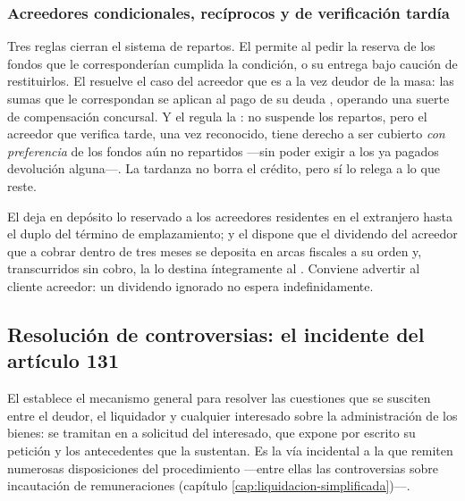 \subsubsection{Acreedores condicionales, recíprocos y de verificación tardía}

Tres reglas cierran el sistema de repartos. El  permite al 
pedir la reserva de los fondos que le corresponderían cumplida la condición, o su entrega bajo
caución de restituirlos. El  resuelve el caso del acreedor que es a la vez deudor de la
masa: las sumas que le correspondan se aplican al pago de su deuda , operando una suerte de compensación concursal. Y el  regula la
: no suspende los repartos, pero el acreedor que verifica
tarde, una vez reconocido, tiene derecho a ser cubierto \emph{con preferencia} de los fondos aún no
repartidos ---sin poder exigir a los ya pagados devolución alguna---. La tardanza no borra el
crédito, pero sí lo relega a lo que reste.

\begin{practica}
El  deja en depósito lo reservado a los acreedores residentes en el extranjero hasta el
duplo del término de emplazamiento; y el  dispone que el dividendo del acreedor que
 a cobrar dentro de tres meses se deposita en arcas fiscales a su orden y,
transcurridos  sin cobro, la \tgr{} lo destina íntegramente al
. Conviene advertir al cliente acreedor: un dividendo ignorado no
espera indefinidamente.
\end{practica}

\subsection{Resolución de controversias: el incidente del artículo 131}

El  establece el mecanismo general para resolver las cuestiones que se susciten entre el
deudor, el liquidador y cualquier interesado sobre la administración de los bienes: se tramitan
en  a solicitud del interesado, que expone por escrito su petición
y los antecedentes que la sustentan. Es la vía incidental a la que remiten numerosas
disposiciones del procedimiento ---entre ellas las controversias sobre incautación de
remuneraciones (capítulo \ref{cap:liquidacion-simplificada})---.


